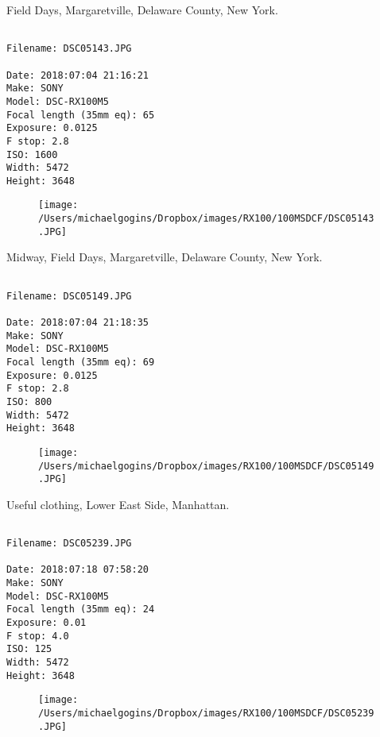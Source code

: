 \documentclass[11pt,letter,DIV=14,paper=landscape]{scrbook}
\begin{document}
\clearpage
\noindent Field Days, Margaretville, Delaware County, New York.
\noindent
\begin{lstlisting}

Filename: DSC05143.JPG

Date: 2018:07:04 21:16:21
Make: SONY
Model: DSC-RX100M5
Focal length (35mm eq): 65
Exposure: 0.0125
F stop: 2.8
ISO: 1600
Width: 5472
Height: 3648
\end{lstlisting}
\clearpage

\begin{figure}
\texttt{[image: /Users/michaelgogins/Dropbox/images/RX100/100MSDCF/DSC05143.JPG]}
\end{figure}
    
\clearpage
\noindent Midway, Field Days, Margaretville, Delaware County, New York.
\noindent
\begin{lstlisting}

Filename: DSC05149.JPG

Date: 2018:07:04 21:18:35
Make: SONY
Model: DSC-RX100M5
Focal length (35mm eq): 69
Exposure: 0.0125
F stop: 2.8
ISO: 800
Width: 5472
Height: 3648
\end{lstlisting}
\clearpage

\begin{figure}
\texttt{[image: /Users/michaelgogins/Dropbox/images/RX100/100MSDCF/DSC05149.JPG]}
\end{figure}
    
\clearpage
\noindent Useful clothing, Lower East Side, Manhattan.
\noindent
\begin{lstlisting}

Filename: DSC05239.JPG

Date: 2018:07:18 07:58:20
Make: SONY
Model: DSC-RX100M5
Focal length (35mm eq): 24
Exposure: 0.01
F stop: 4.0
ISO: 125
Width: 5472
Height: 3648
\end{lstlisting}
\clearpage

\begin{figure}
\texttt{[image: /Users/michaelgogins/Dropbox/images/RX100/100MSDCF/DSC05239.JPG]}
\end{figure}
    
\end{document}
